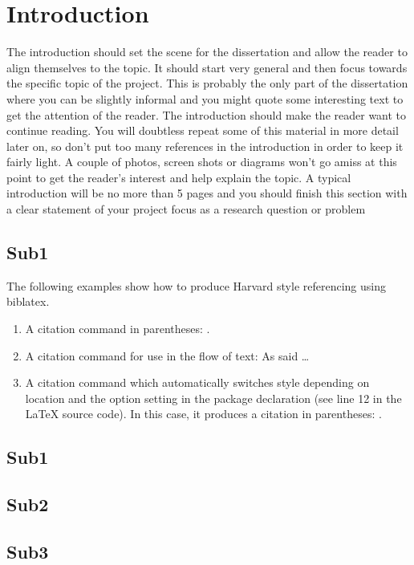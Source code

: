 \documentclass[a4paper, 12pt]{article}
\begin{document}
\section{Introduction}
The introduction should set the scene for the dissertation and allow the reader to align themselves to the topic. It should start very general and then focus towards the specific topic of the project. This is probably the only part of the dissertation where you can be slightly informal and you might quote some interesting text to get the attention of the reader. The introduction should make the reader want to continue reading. You will doubtless repeat some of this material in more detail later on, so don’t put too many references in the introduction in order to keep it fairly light. A couple of photos, screen shots or diagrams won’t go amiss at this point to get the reader’s interest and help explain the topic. A typical introduction will be no more than 5 pages and you should finish this section with a clear statement of your project focus as a research question or problem


\subsection{Sub1}


The following examples show how to produce Harvard style referencing using biblatex.

\begin{enumerate}
	\item A citation command in parentheses: \parencite{Smith:2012qr}.
	\item A citation command for use in the flow of text: As \textcite{Smith:2013jd} said \dots
	\item A citation command which automatically switches style depending on location and the option setting in the package declaration (see line 12 in the LaTeX source code). In this case, it produces a citation in parentheses: \autocite{Other:2014ab}.
\end{enumerate}


\subsection{Sub1}


\subsection{Sub2}


\subsection{Sub3}
\end{document}
